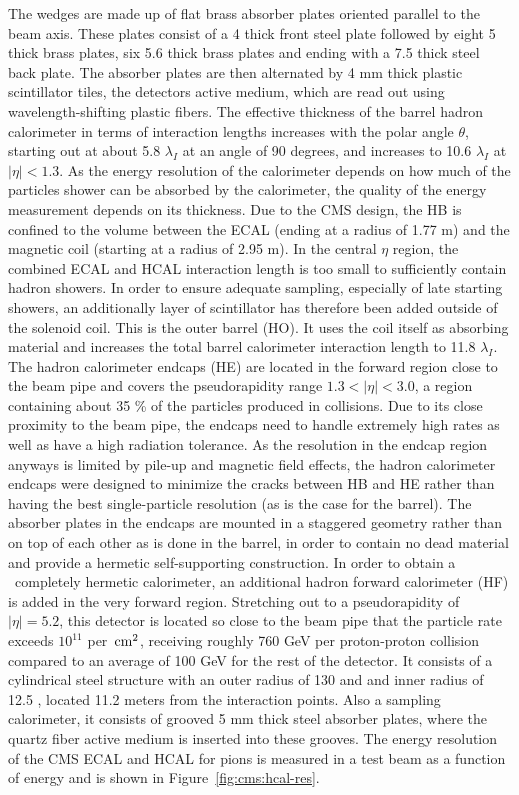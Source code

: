 The wedges are made up of flat brass absorber plates oriented parallel to the beam axis. These plates consist of a 4 \cm thick front steel plate followed by eight 5 \cm thick brass plates, six 5.6 \cm thick brass plates and ending with a 7.5 \cm thick steel back plate. The absorber plates are then alternated by 4 mm thick plastic scintillator tiles, the detectors active medium, which are read out using wavelength-shifting plastic fibers. The effective thickness of the barrel hadron calorimeter in terms of interaction lengths increases with the polar angle $\theta$, starting out at about 5.8 $\lambda_I$ at an angle of 90 degrees, and increases to 10.6 $\lambda_I$ at $|\eta|<1.3$.
As the energy resolution of the calorimeter depends on how much of the particles shower can be absorbed by the calorimeter, the quality of the energy measurement depends on its thickness. Due to the CMS design, the HB is confined to the volume between the ECAL (ending at a radius of 1.77 m) and the magnetic coil (starting at a radius of 2.95 m).
In the central $\eta$ region, the combined ECAL and HCAL interaction length is too small to sufficiently contain hadron showers. 
In order to ensure adequate sampling, especially of late starting showers, an additionally layer of scintillator has therefore been added outside of the solenoid coil. This is the outer barrel (HO). It uses the coil itself as absorbing material and increases the total barrel calorimeter interaction length to 11.8 $\lambda_I$.
The hadron calorimeter endcaps (HE) are located in the forward region close to the beam pipe and covers the pseudorapidity range $1.3 < |\eta|< 3.0$, a region containing about 35 \% of the particles produced in collisions. Due to its close proximity to the beam pipe, the endcaps need to handle extremely high rates as well as have a high radiation tolerance.
As the resolution in the endcap region anyways is limited by pile-up and magnetic field effects, the hadron calorimeter endcaps were designed to minimize the cracks between HB and HE rather than having the best single-particle resolution (as is the case for the barrel).
The absorber plates in the endcaps are mounted in a staggered geometry rather than on top of each other as is done in the barrel, in order to contain no dead material and provide a hermetic self-supporting construction.
In order to obtain a ~completely hermetic calorimeter, an additional hadron forward calorimeter (HF) is added in the very forward region.
Stretching out to a pseudorapidity of $|\eta|= 5.2$, this detector is located so close to the beam pipe that the particle rate exceeds $10^{11}$ per $\,\text{cm}^2$, receiving roughly 760 GeV per proton-proton collision compared to an average of 100 GeV for the rest of the detector. It consists of a cylindrical steel structure with an outer radius of 130 \cm and and inner radius of 12.5 \cm, located 11.2 meters from the interaction points. Also a sampling calorimeter, it consists of grooved 5 mm thick steel absorber plates, where the quartz fiber active medium is inserted into these grooves.
The energy resolution of the CMS ECAL and HCAL for pions is measured in a test beam as a function of energy and is shown in Figure~\ref{fig:cms:hcal-res}.

